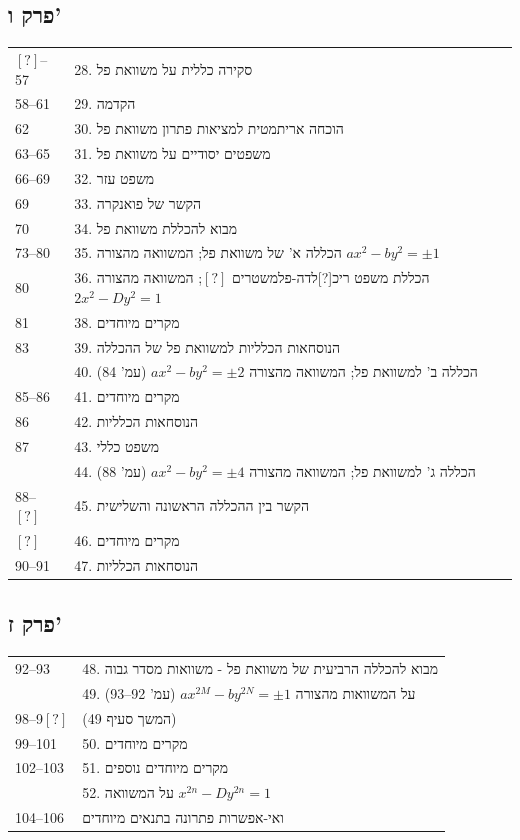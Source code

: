 \newpage
\subsection*{פרק ו'}
\begin{tabular}{ll}
$[?]$--57 & 28. סקירה כללית על משוואת פל \\
58--61 & 29. הקדמה \\
62 & 30. הוכחה אריתמטית למציאות פתרון משוואת פל \\
63--65 & 31. משפטים יסודיים על משוואת פל \\
66--69 & 32. משפט עזר \\
69 & 33. הקשר של פואנקרה \\
70 & 34. מבוא להכללת משוואת פל \\
73--80 & 35. הכללה א' של משוואת פל; המשוואה מהצורה $ax^2 - by^2 = \pm 1$ \\
80 & 36. הכללת משפט ריכ[?]לדה-פלמשטרים $[?]$; המשוואה מהצורה $2x^2 - Dy^2 = 1$ \\
81 & 38. מקרים מיוחדים \\
83 & 39. הנוסחאות הכלליות למשוואת פל של ההכללה \\
 & 40. הכללה ב' למשוואת פל; המשוואה מהצורה $ax^2 - by^2 = \pm 2$ (עמ' 84) \\
85--86 & 41. מקרים מיוחדים \\
86 & 42. הנוסחאות הכלליות \\
87 & 43. משפט כללי \\
 & 44. הכללה ג' למשוואת פל; המשוואה מהצורה $ax^2 - by^2 = \pm 4$ (עמ' 88) \\
88--$[?]$ & 45. הקשר בין ההכללה הראשונה והשלישית \\
$[?]$ & 46. מקרים מיוחדים \\
90--91 & 47. הנוסחאות הכלליות \\
\end{tabular}

\newpage
\subsection*{פרק ז'}
\begin{tabular}{ll}
92--93 & 48. מבוא להכללה הרביעית של משוואת פל - משוואות מסדר גבוה \\
 & 49. על המשוואות מהצורה $ax^{2M} - by^{2N} = \pm 1$ (עמ' 92--93) \\
98--9$[?]$ & (המשך סעיף 49) \\
99--101 & 50. מקרים מיוחדים \\
102--103 & 51. מקרים מיוחדים נוספים \\
 & 52. על המשוואה $x^{2n} - Dy^{2n} = 1$ \\
104--106 & ואי-אפשרות פתרונה בתנאים מיוחדים \\
\end{tabular}

